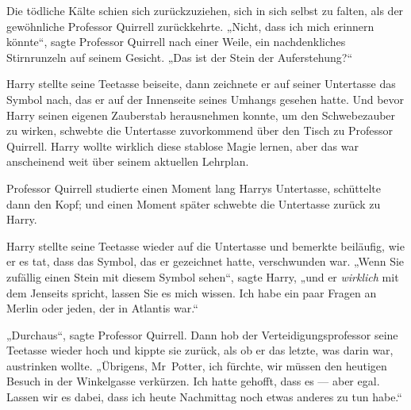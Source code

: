 Die tödliche Kälte schien sich zurückzuziehen, sich in sich selbst zu falten, als der gewöhnliche Professor Quirrell zurückkehrte.
„Nicht, dass ich mich erinnern könnte“, sagte Professor Quirrell nach einer Weile, ein nachdenkliches Stirnrunzeln auf seinem Gesicht.
„Das ist der Stein der Auferstehung?“

Harry stellte seine Teetasse beiseite, dann zeichnete er auf seiner Untertasse das Symbol nach, das er auf der Innenseite seines Umhangs gesehen hatte. Und bevor Harry seinen eigenen Zauberstab herausnehmen konnte, um den Schwebezauber zu wirken, schwebte die Untertasse zuvorkommend über den Tisch zu Professor Quirrell. Harry wollte wirklich diese stablose Magie lernen, aber das war anscheinend weit über seinem aktuellen Lehrplan.

Professor Quirrell studierte einen Moment lang Harrys Untertasse, schüttelte dann den Kopf; und einen Moment später schwebte die Untertasse zurück zu Harry.

Harry stellte seine Teetasse wieder auf die Untertasse und bemerkte beiläufig, wie er es tat, dass das Symbol, das er gezeichnet hatte, verschwunden war.
„Wenn Sie zufällig einen Stein mit diesem Symbol sehen“, sagte Harry, „und er \emph{wirklich} mit dem Jenseits spricht, lassen Sie es mich wissen. Ich habe ein paar Fragen an Merlin oder jeden, der in Atlantis war.“

„Durchaus“, sagte Professor Quirrell. Dann hob der Verteidigungsprofessor seine Teetasse wieder hoch und kippte sie zurück, als ob er das letzte, was darin war, austrinken wollte. „Übrigens, Mr~Potter, ich fürchte, wir müssen den heutigen Besuch in der Winkelgasse verkürzen. Ich hatte gehofft, dass es — aber egal. Lassen wir es dabei, dass ich heute Nachmittag noch etwas anderes zu tun habe.“

